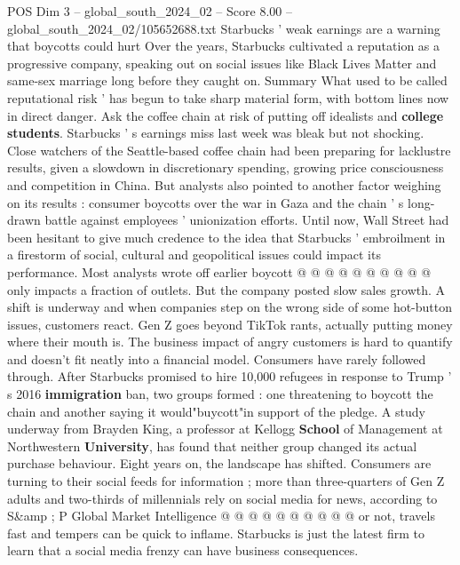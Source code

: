 \begin{textsample}{POS Dim 3 – global\_south\_2024\_02 – Score 8.00 – global\_south\_2024\_02/105652688.txt}  \label{ex:f3_pos_371}
Starbucks ' weak earnings are a warning that boycotts could hurt Over the years, Starbucks cultivated a reputation as a progressive company, speaking out on social issues like Black Lives Matter and same-sex marriage long before they caught on.
Summary What used to be called reputational risk ' has begun to take sharp material form, with bottom lines now in direct danger.
Ask the coffee chain at risk of putting off idealists and \textbf{college} \textbf{students}.
Starbucks ' s earnings miss last week was bleak but not shocking.
Close watchers of the Seattle-based coffee chain had been preparing for lacklustre results, given a slowdown in discretionary spending, growing price consciousness and competition in China.
But analysts also pointed to another factor weighing on its results : consumer boycotts over the war in Gaza and the chain ' s long-drawn battle against employees ' unionization efforts.
Until now, Wall Street had been hesitant to give much credence to the idea that Starbucks ' embroilment in a firestorm of social, cultural and geopolitical issues could impact its performance.
Most analysts wrote off earlier boycott @ @ @ @ @ @ @ @ @ @ only impacts a fraction of outlets.
But the company posted slow sales growth.
A shift is underway and when companies step on the wrong side of some hot-button issues, customers react.
Gen Z goes beyond TikTok rants, actually putting money where their mouth is.
The business impact of angry customers is hard to quantify and doesn't fit neatly into a financial model.
Consumers have rarely followed through.
After Starbucks promised to hire 10,000 refugees in response to Trump ' s 2016 \textbf{immigration} ban, two groups formed : one threatening to boycott the chain and another saying it would"buycott"in support of the pledge.
A study underway from Brayden King, a professor at Kellogg \textbf{School} of Management at Northwestern \textbf{University}, has found that neither group changed its actual purchase behaviour.
Eight years on, the landscape has shifted.
Consumers are turning to their social feeds for information ; more than three-quarters of Gen Z adults and two-thirds of millennials rely on social media for news, according to S\&amp ; P Global Market Intelligence @ @ @ @ @ @ @ @ @ @ or not, travels fast and tempers can be quick to inflame.
Starbucks is just the latest firm to learn that a social media frenzy can have business consequences.

\end{textsample}
